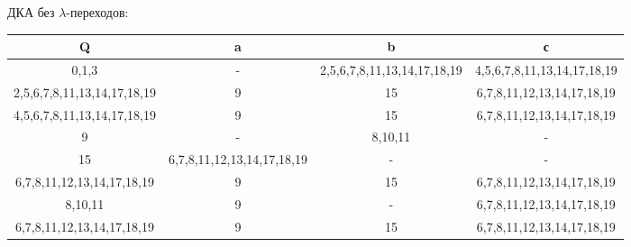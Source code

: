 \documentclass{article}
\begin{document}
\begin{enumerate}
    
    ДКА без $\lambda$-переходов:
    \begin{center}
        \begin{tabular}{|c|c|c|c|}
            \hline
            \textbf{Q} & \textbf{a} & \textbf{b}& \textbf{с}  \\
            \hline
            {0,1,3} & - & {2,5,6,7,8,11,13,14,17,18,19} & {4,5,6,7,8,11,13,14,17,18,19} \\
            \hline
            {2,5,6,7,8,11,13,14,17,18,19} & {9} & {15} & {6,7,8,11,12,13,14,17,18,19} \\
            \hline
            {4,5,6,7,8,11,13,14,17,18,19} & {9} & {15} & {6,7,8,11,12,13,14,17,18,19} \\
            \hline
            {9} & {-} & {8,10,11} & {-} \\
            \hline
            {15} & {6,7,8,11,12,13,14,17,18,19} & {-} & {-} \\
            \hline
            {6,7,8,11,12,13,14,17,18,19} & {9} & {15} & {6,7,8,11,12,13,14,17,18,19} \\
            \hline
            {8,10,11} & {9} & {-} & {6,7,8,11,12,13,14,17,18,19} \\
            \hline
            {6,7,8,11,12,13,14,17,18,19} & {9} & {15} & {6,7,8,11,12,13,14,17,18,19} \\
            \hline
        \end{tabular}\\
    \end{center}
    

\end{enumerate}
\end{document}
